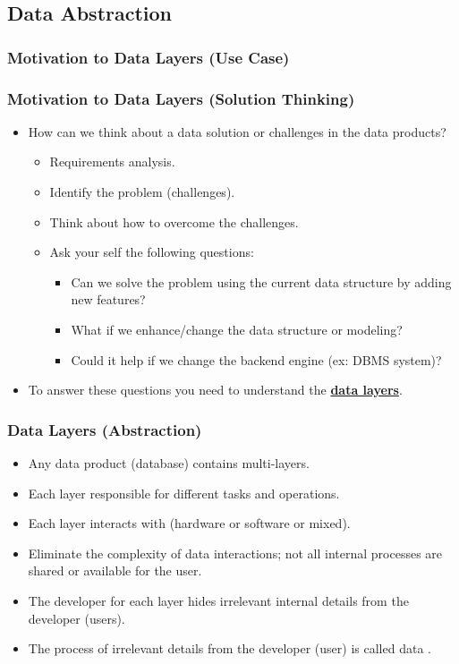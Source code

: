 \subsection{Data Abstraction}
\begin{frame}
	\frametitle{Motivation to Data Layers (Use Case)}	
		

\end{frame}
\begin{frame}
	\frametitle{Motivation to Data Layers (Solution Thinking)}
	
	\begin{itemize}[<+->]
		\item How can we think about a data solution or challenges in the data products?
		\begin{itemize}[<+->]
			\item Requirements analysis.
			\item Identify the problem (challenges).
			\item Think about how to overcome the challenges.
			\item Ask your self the following questions:
			\begin{itemize}[<+->]
				\item Can we solve the problem using the current data structure by adding new features?
				\item What if we enhance/change the data structure or modeling?
				\item Could it help if we change the backend engine (ex: DBMS system)?
			\end{itemize}			
		\end{itemize}
		\item To answer these questions you need to understand the \textbf{\underline{data layers}}.
	\end{itemize}
	
\end{frame}
\begin{frame}
	\frametitle{Data Layers (Abstraction)}
	\begin{itemize}[<+->]
		\item Any data product (database) contains multi-layers.
		\item Each layer responsible for different tasks and operations.
		\item Each layer interacts with (hardware or software or mixed).
		\item Eliminate the complexity of data interactions; not all internal processes are shared or available for the user.
		\item The developer for each layer hides irrelevant internal details from the developer (users). 
		\item The process of \textbf{\underline{}} irrelevant details from the developer (user) is called data \textbf{\underline{}}.
	\end{itemize}	
\end{frame}
